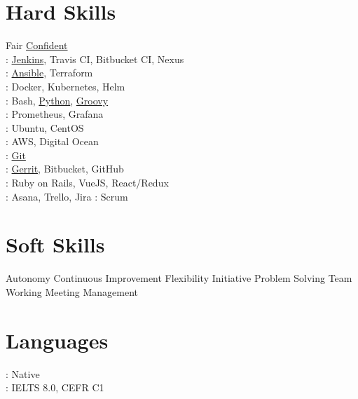 \documentclass[]{deedy-resume-openfont}
\begin{document}
\begin{minipage}[t]{0.33\textwidth}
\section{Hard Skills}
Fair \textbullet{} \underline{Confident}\\
: \underline{Jenkins}, Travis CI, Bitbucket CI, Nexus\\
: \underline{Ansible}, Terraform \\
: Docker, Kubernetes, Helm \\
: Bash, \underline{Python}, \underline{Groovy} \\
: Prometheus, Grafana \\
: Ubuntu, CentOS \\
: AWS, Digital Ocean \\
: \underline{Git}\\
: \underline{Gerrit}, Bitbucket, GitHub\\
: Ruby on Rails, VueJS, React/Redux\\
: Asana, Trello, Jira
: Scrum

\section{Soft Skills}
Autonomy \textbullet{} Continuous Improvement \textbullet{} Flexibility \textbullet{}
Initiative \textbullet{} Problem Solving \textbullet{} Team Working 	\textbullet{} Meeting Management\sectionsep
\section{Languages}
: Native\\
: IELTS 8.0, CEFR C1
\sectionsep

%
%

\end{minipage}
\vline
\hspace{0.01\textwidth}
\end{document}
